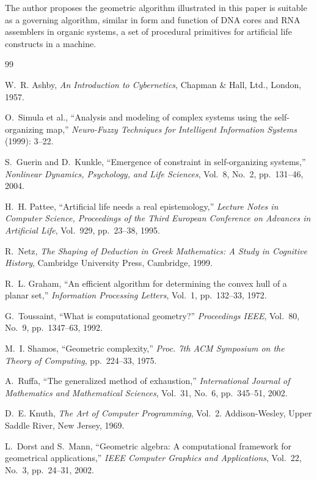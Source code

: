 \documentclass[11pt]{article}
\begin{document}
The author proposes the geometric algorithm illustrated in this paper is suitable as a governing algorithm, similar in form and function of DNA cores and RNA assemblers in organic systems, a set of procedural primitives for artificial life constructs in a machine.

\begin{thebibliography}{99}

W.~R. Ashby,
\textit{An Introduction to Cybernetics},
Chapman \& Hall, Ltd., London, 1957.

O.~Simula et al.,
``Analysis and modeling of complex systems using the self-organizing map,''
\textit{Neuro-Fuzzy Techniques for Intelligent Information Systems} (1999): 3--22.

S.~Guerin and D.~Kunkle,
``Emergence of constraint in self-organizing systems,''
\textit{Nonlinear Dynamics, Psychology, and Life Sciences},
Vol.~8, No.~2, pp.~131--46, 2004.

H.~H. Pattee,
``Artificial life needs a real epistemology,''
\textit{Lecture Notes in Computer Science, Proceedings of the Third European Conference on Advances in Artificial Life},
Vol.~929, pp.~23--38, 1995.

R.~Netz,
\textit{The Shaping of Deduction in Greek Mathematics: A Study in Cognitive History},
Cambridge University Press, Cambridge, 1999.

R.~L. Graham,
``An efficient algorithm for determining the convex hull of a planar set,''
\textit{Information Processing Letters},
Vol.~1, pp.~132--33, 1972.

G.~Toussaint,
``What is computational geometry?''
\textit{Proceedings IEEE},
Vol.~80, No.~9, pp.~1347--63, 1992.

M.~I. Shamos,
``Geometric complexity,''
\textit{Proc. 7th ACM Symposium on the Theory of Computing},
pp.~224--33, 1975.

A.~Ruffa,
``The generalized method of exhaustion,''
\textit{International Journal of Mathematics and Mathematical Sciences},
Vol.~31, No.~6, pp.~345--51, 2002.

D.~E. Knuth,
\textit{The Art of Computer Programming},
Vol.~2. Addison-Wesley, Upper Saddle River, New Jersey, 1969.

L.~Dorst and S.~Mann,
``Geometric algebra: A computational framework for geometrical applications,''
\textit{IEEE Computer Graphics and Applications},
Vol.~22, No.~3, pp.~24--31, 2002.


\end{thebibliography}
\end{document}
